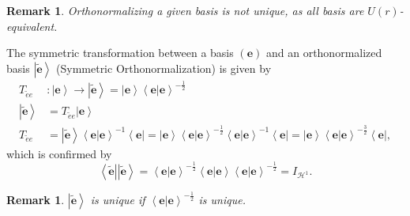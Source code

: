 \documentclass[aps,preprint]{revtex4}%
\newtheorem{remark}[theorem]{Remark}
\begin{document}
\begin{remark}
Orthonormalizing a given basis is not unique, as all basis are $U\left(
r\right)  $-equivalent.
\end{remark}

The symmetric transformation between a basis $\left(  \mathbf{e}\right)  $ and
an orthonormalized basis $\left\vert \widetilde{\mathbf{e}}\right\rangle $
(Symmetric Orthonormalization) is given by
\begin{align}
T_{\widetilde{e}e}  &  :\left\vert \mathbf{e}\right\rangle \rightarrow
\left\vert \widetilde{\mathbf{e}}\right\rangle =\left\vert \mathbf{e}%
\right\rangle \left\langle \left.  \mathbf{e}\right\vert \mathbf{e}%
\right\rangle ^{-\frac{1}{2}}\\
\left\vert \widetilde{\mathbf{e}}\right\rangle  &  =T_{\widetilde{e}%
e}\left\vert \mathbf{e}\right\rangle \\
T_{\widetilde{e}e}  &  =\left\vert \widetilde{\mathbf{e}}\right\rangle
\left\langle \left.  \mathbf{e}\right\vert \mathbf{e}\right\rangle
^{-1}\left\langle \mathbf{e}\right\vert =\left\vert \mathbf{e}\right\rangle
\left\langle \left.  \mathbf{e}\right\vert \mathbf{e}\right\rangle ^{-\frac
{1}{2}}\left\langle \left.  \mathbf{e}\right\vert \mathbf{e}\right\rangle
^{-1}\left\langle \mathbf{e}\right\vert =\left\vert \mathbf{e}\right\rangle
\left\langle \left.  \mathbf{e}\right\vert \mathbf{e}\right\rangle ^{-\frac
{3}{2}}\left\langle \mathbf{e}\right\vert ,
\end{align}
which is confirmed by%
\begin{equation}
\left\langle \widetilde{\mathbf{e}}\right\vert \left\vert
\widetilde{\mathbf{e}}\right\rangle =\left\langle \left.  \mathbf{e}%
\right\vert \mathbf{e}\right\rangle ^{-\frac{1}{2}}\left\langle \left.
\mathbf{e}\right\vert \mathbf{e}\right\rangle \left\langle \left.
\mathbf{e}\right\vert \mathbf{e}\right\rangle ^{-\frac{1}{2}}=I_{\mathcal{H}%
^{1}}.
\end{equation}


\begin{remark}
$\left\vert \widetilde{\mathbf{e}}\right\rangle $ is unique if $\left\langle
\left.  \mathbf{e}\right\vert \mathbf{e}\right\rangle ^{-\frac{1}{2}}$ is unique.
\end{remark}
\end{document}

